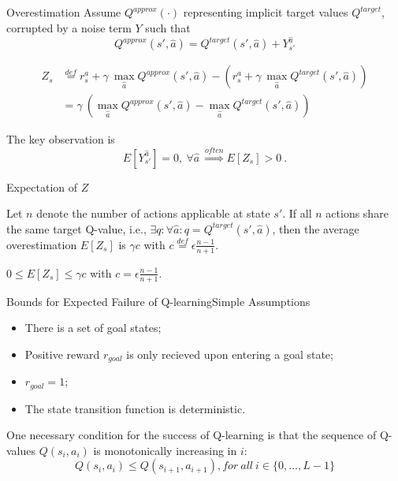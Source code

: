 \documentclass{beamer}
\newcommand{\qa}{Q^{approx}}
\newcommand{\qt}{Q^{target}}
\newcommand{\ha}{\hat{a}}
\begin{document}
\begin{frame}{Overestimation}
	Assume $Q^{approx}(\cdot)$ representing implicit target values $Q^{target}$, corrupted by a noise term $Y$ such that
	\begin{equation}\nonumber
		\qa(s',\ha) = \qt(s', \ha) + Y_{s'}^{\ha}
	\end{equation}
	
	\begin{equation}
	\begin{aligned}
		Z_s &\overset{def}{=} r_s^a + \gamma~ \max_{\ha} \qa(s', \ha) - \left( r_s^a + \gamma~  \max_{\ha} \qt(s', \ha)\right) \\
		& = \gamma~ \left( \max_{\ha} \qa(s', \ha) - \max_{\ha} \qt(s', \ha)\right)
	\end{aligned}
	\end{equation}
	
	The key observation is
	\begin{equation}\nonumber
		E[Y_{s'}^{\ha}] = 0, ~ \forall \ha ~ \overset{often}{\Longrightarrow} E[Z_s] > 0 ~.
	\end{equation}
\end{frame}

\begin{frame}{Expectation of $Z$}
	\begin{Lemma}
		Let $n$ denote the number of actions applicable at state $s'$. If all $n$ actions share the same target Q-value, i.e., $\exists q: \forall \ha: q=\qt(s', \ha)$, then the average overestimation $E[Z_s]$ is $\gamma c$ with $c \overset{def}{=} \epsilon \frac{n-1}{n+1}$.
	\end{Lemma}
	\begin{Corollary}
		$0 \leq E[Z_s] \leq \gamma c$ with $c = \epsilon \frac{n-1}{n+1}$.
	\end{Corollary}
\end{frame}


\begin{frame}{Bounds for Expected Failure of Q-learning}{Simple Assumptions}
	\begin{itemize}
		\item There is a set of goal states;
		\item Positive reward $r_{goal}$ is only recieved upon entering a goal state;
		\item $r_{goal} = 1$;
		\item The state transition function is deterministic.
	\end{itemize}

	One necessary condition for the success of Q-learning is that the sequence of Q-values $Q(s_i, a_i)$ is monotonically increasing in $i$:
	\begin{equation}
		Q(s_i, a_i) \leq Q(s_{i+1}, a_{i+1}), for~all~ i \in \{0, \ldots, L-1\}
	\end{equation}
\end{frame}
\end{document}
